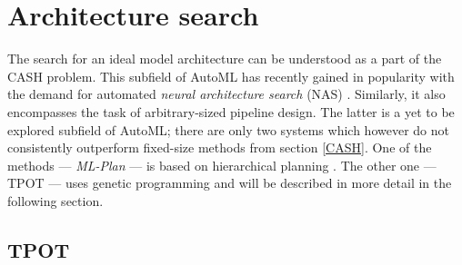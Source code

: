 \section{Architecture search}
The search for an ideal model architecture can be understood as a part of the
CASH problem. This subfield of AutoML has recently gained in popularity with the
demand for automated \emph{neural architecture search} (NAS)
\cite{2018arXiv180805377E}. Similarly, it also encompasses the task of
arbitrary-sized pipeline design. The latter is a yet to be explored subfield of
AutoML; there are only two systems which however do not consistently outperform
fixed-size methods from section \ref{CASH}. \citep{automl_book} One of the methods
--- \emph{ML-Plan} --- is based on hierarchical planning \citep{Mohr2018}. The
other one --- TPOT --- uses genetic programming and will be described in more
detail in the following section.

\subsection{TPOT}